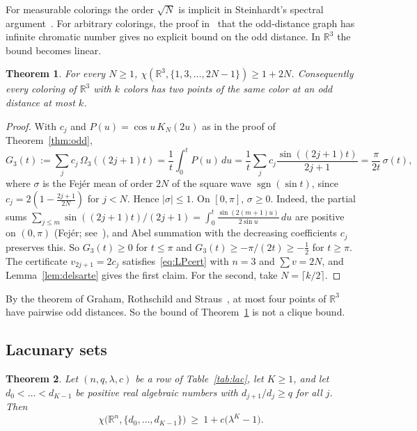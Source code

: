 \documentclass[11pt]{amsart}
\newtheorem{theorem}{Theorem}[section]
\theoremstyle{definition}
\newcommand{\R}{\mathbb{R}}
\begin{document}
For measurable colorings the order $\sqrt N$ is implicit in Steinhardt's spectral argument~\cite{Steinhardt}. For arbitrary colorings, the proof in~\cite{DaviesOdd} that the odd-distance graph has infinite chromatic number gives no explicit bound on the odd distance. In $\R^3$ the bound becomes linear.

\begin{theorem}\label{thm:odd3}
For every $N\ge1$, $\chi(\R^3,\{1,3,\dots,2N-1\})\ge 1+2N$. Consequently every coloring of $\R^3$ with $k$ colors has two points of the same color at an odd distance at most $k$.
\end{theorem}

\begin{proof}
With $c_j$ and $P(u)=\cos u\,K_N(2u)$ as in the proof of Theorem~\ref{thm:odd},
\[
G_3(t):=\sum_jc_j\,\Omega_3((2j+1)t)=\frac1t\int_0^tP(u)\,du=\frac1t\sum_jc_j\frac{\sin((2j+1)t)}{2j+1}=\frac{\pi}{2t}\,\sigma(t),
\]
where $\sigma$ is the Fej\'er mean of order $2N$ of the square wave $\operatorname{sgn}(\sin t)$, since $c_j=2(1-\frac{2j+1}{2N})$ for $j<N$. Hence $|\sigma|\le1$. On $[0,\pi]$, $\sigma\ge0$. Indeed, the partial sums $\sum_{j\le m}\sin((2j+1)t)/(2j+1)=\int_0^t\frac{\sin(2(m+1)u)}{2\sin u}\,du$ are positive on $(0,\pi)$ (Fej\'er; see~\cite[\S 4.1]{AAR}), and Abel summation with the decreasing coefficients $c_j$ preserves this. So $G_3(t)\ge0$ for $t\le\pi$ and $G_3(t)\ge-\pi/(2t)\ge-\frac12$ for $t\ge\pi$. The certificate $v_{2j+1}=2c_j$ satisfies~\eqref{eq:LPcert} with $n=3$ and $\sum v=2N$, and Lemma~\ref{lem:delsarte} gives the first claim. For the second, take $N=\lceil k/2\rceil$.
\end{proof}

By the theorem of Graham, Rothschild and Straus~\cite{GRS}, at most four points of $\R^3$ have pairwise odd distances. So the bound of Theorem~\ref{thm:odd3} is not a clique bound.

\subsection{Lacunary sets}


\begin{theorem}\label{thm:lacunary}
Let $(n,q,\lambda,c)$ be a row of Table~\ref{tab:lac}, let $K\ge1$, and let $d_0<\dots<d_{K-1}$ be positive real algebraic numbers with $d_{j+1}/d_j\ge q$ for all $j$. Then
\[
\chi\bigl(\R^n,\{d_0,\dots,d_{K-1}\}\bigr)\ \ge\ 1+c\bigl(\lambda^K-1\bigr).
\]
\end{theorem}
\end{document}
